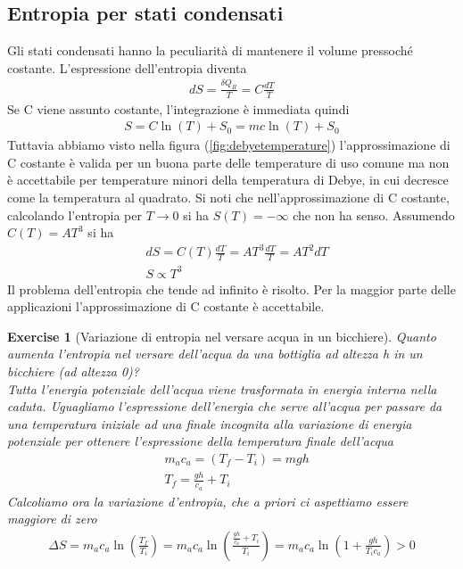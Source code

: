 \documentclass[10pt,a4paper]{article}
\newtheorem{exercise}{Exercise}
\begin{document}
\subsection{Entropia per stati condensati}
Gli stati condensati hanno la peculiarità di mantenere il volume pressoché costante. L'espressione dell'entropia diventa
\begin{align*}
	dS = \frac{\delta Q_R}{T}=C\frac{dT}{T}
\end{align*}
Se C viene assunto costante, l'integrazione è immediata quindi
\begin{align*}
	S = C \ln(T)+S_0 = m c \ln(T)+S_0
\end{align*}
Tuttavia abbiamo visto nella figura (\ref{fig:debyetemperature}) l'approssimazione di C costante è valida per un buona parte delle temperature di uso comune ma non è accettabile per temperature minori della temperatura di Debye, in cui decresce come la temperatura al quadrato. Si noti che nell'approssimazione di C costante, calcolando l'entropia per \(T \to 0 \) si ha \(S(T) = -\infty\) che non ha senso. Assumendo \(C(T) = AT^3\) si ha
\begin{align*}
	&dS = C(T)\frac{dT}{T} = AT^3 \frac{dT}{T} = AT^2 dT\\
	&S \propto T^3
\end{align*}
Il problema dell'entropia che tende ad infinito è risolto. Per la maggior parte delle applicazioni l'approssimazione di C costante è accettabile. 
\begin{exercise}[Variazione di entropia nel versare acqua in un bicchiere]
	Quanto aumenta l'entropia nel versare dell'acqua da una bottiglia ad altezza h in un bicchiere (ad altezza 0)?\\
	Tutta l'energia potenziale dell'acqua viene trasformata in energia interna nella caduta. Uguagliamo l'espressione dell'energia che serve all'acqua per passare da una temperatura iniziale ad una finale incognita alla variazione di energia potenziale per ottenere l'espressione della temperatura finale dell'acqua
	\begin{align*}
		&m_a c_a = (T_f - T_i) = mgh\\
		&T_f = \frac{gh}{c_a}+T_i
	\end{align*}
	Calcoliamo ora la variazione d'entropia, che a priori ci aspettiamo essere maggiore di zero
	\begin{align*}
		\Delta S = m_a c_a \ln\left(\frac{T_f}{T_i}\right) = m_a c_a \ln\left(\frac{ \frac{gh}{c_a}+T_i}{T_i}\right) = m_a c_a \ln \left(1+ \frac{gh}{T_ic_a}\right)>0
	\end{align*}
\end{exercise}
\end{document}
